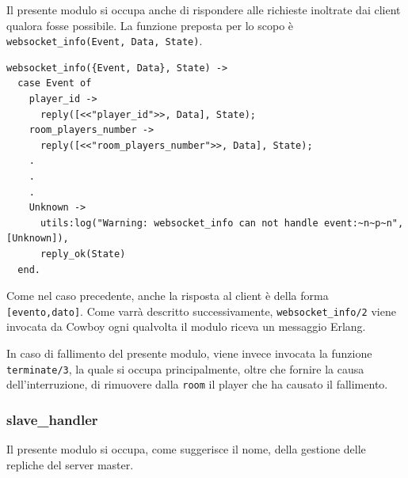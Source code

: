 \documentclass[paper=a4, fontsize=11pt]{scrartcl} %
\numberwithin{equation}{section} %
\numberwithin{figure}{section} %
\numberwithin{table}{section} %
\begin{document}
Il presente modulo si occupa anche di rispondere alle richieste inoltrate dai client qualora fosse possibile. La funzione preposta per lo scopo è \texttt{websocket\_info({Event, Data}, State)}.
\begin{lstlisting}[basicstyle=\footnotesize]
websocket_info({Event, Data}, State) ->
  case Event of
    player_id ->
      reply([<<"player_id">>, Data], State);
    room_players_number ->
      reply([<<"room_players_number">>, Data], State);
    .
    .
    .
    Unknown ->
      utils:log("Warning: websocket_info can not handle event:~n~p~n", [Unknown]),
      reply_ok(State)
  end.
\end{lstlisting}
Come nel caso precedente, anche la risposta al client è della forma \texttt{[evento,dato]}. Come varrà descritto successivamente, \texttt{websocket\_info/2} viene invocata da Cowboy ogni qualvolta il modulo riceva un messaggio Erlang.

In caso di fallimento del presente modulo, viene invece invocata la funzione \texttt{terminate/3}, la quale si occupa principalmente, oltre che fornire la causa dell'interruzione, di rimuovere dalla \texttt{room} il player che ha causato il fallimento.
\subsubsection{slave\_handler}
Il presente modulo si occupa, come suggerisce il nome, della gestione delle repliche del server master.
\end{document}
